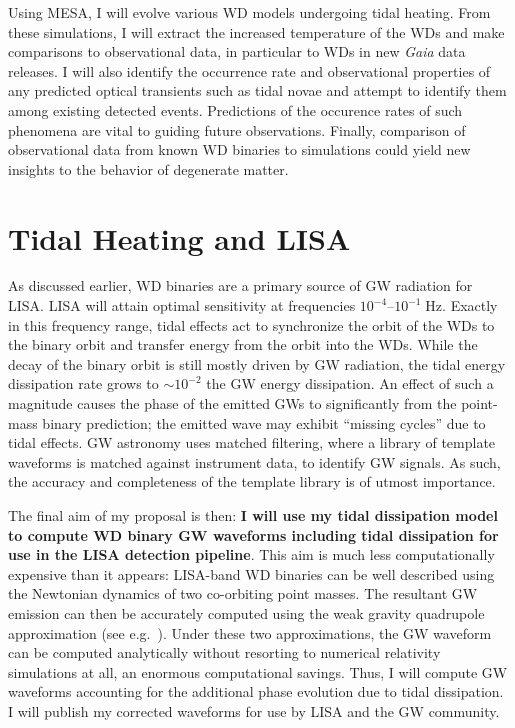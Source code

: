 \documentclass[12pt,
        usenames, %
        dvipsnames %
    ]{article}
\begin{document}
Using MESA, I will evolve various WD models undergoing tidal heating. From these
simulations, I will extract the increased temperature of the WDs and make
comparisons to observational data, in particular to WDs in new \emph{Gaia} data
releases. I will also identify the occurrence rate and observational properties
of any predicted optical transients such as tidal novae and attempt to identify
them among existing detected events. Predictions of the occurence rates of such
phenomena are vital to guiding future observations. Finally, comparison of
observational data from known WD binaries to simulations could yield new
insights to the behavior of degenerate matter.

\section{Tidal Heating and LISA}

As discussed earlier, WD binaries are a primary source of GW radiation for
LISA\@. LISA will attain optimal sensitivity at frequencies
$10^{-4}$--$10^{-1}\;\mathrm{Hz}$\cite{LISA_band}. Exactly in this frequency
range, tidal effects act to synchronize the orbit of the WDs to the binary
orbit and transfer energy from the orbit into the WDs. While the decay
of the binary orbit is still mostly driven by GW radiation, the tidal energy
dissipation rate grows to $\sim10^{-2}$ the GW energy
dissipation\cite{fullerII,fullerIV}. An effect of such a magnitude causes the
phase of the emitted GWs to significantly from the point-mass binary
prediction; the emitted wave may exhibit ``missing cycles'' due to tidal
effects\cite{fullerII}. GW astronomy uses matched filtering, where a library of
template waveforms is matched against instrument data, to identify GW signals.
As such, the accuracy and completeness of the template library is of utmost
importance.

The final aim of my proposal is then: \textbf{I will use my tidal dissipation
model to compute WD binary GW waveforms including tidal dissipation for use in
the LISA detection pipeline}. This aim is much less computationally expensive
than it appears: LISA-band WD binaries can be well described using the Newtonian
dynamics of two co-orbiting point masses\cite{DWD_pointmass}. The resultant GW
emission can then be accurately computed using the weak gravity quadrupole
approximation (see e.g.~\cite{peters,lsst_wd}). Under these two approximations,
the GW waveform can be computed analytically without resorting to numerical
relativity simulations at all, an enormous computational savings. Thus, I will
compute GW waveforms accounting for the additional phase evolution due to tidal
dissipation. I will publish my corrected waveforms for use by LISA and the GW
community.
\end{document}

